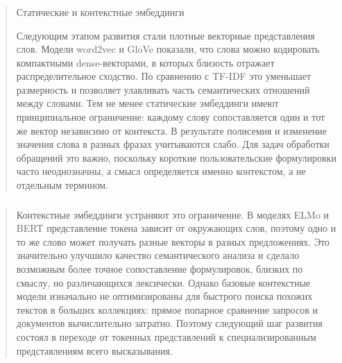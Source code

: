 \documentclass[
]{article}
\begin{document}
\hypertarget{section-2}{%
\subsubsection{}\label{section-2}}

\begin{quote}
Статические и контекстные эмбеддинги

Следующим этапом развития стали плотные векторные представления слов.
Модели word2vec и GloVe показали, что слова можно кодировать компактными
dense-векторами, в которых близость отражает распределительное сходство.
По сравнению с TF-IDF это уменьшает размерность и позволяет улавливать
часть семантических отношений между словами. Тем не менее статические
эмбеддинги имеют принципиальное ограничение: каждому слову
сопоставляется один и тот же вектор независимо от контекста. В
результате полисемия и изменение значения слова в разных фразах
учитываются слабо. Для задач обработки обращений это важно, поскольку
короткие пользовательские формулировки часто неоднозначны, а смысл
определяется именно контекстом, а не отдельным термином.
\end{quote}

\hypertarget{section-3}{%
\subsubsection{}\label{section-3}}

\begin{quote}
Контекстные эмбеддинги устраняют это ограничение. В моделях ELMo и BERT
представление токена зависит от окружающих слов, поэтому одно и то же
слово может получать разные векторы в разных предложениях. Это
значительно улучшило качество семантического анализа и сделало возможным
более точное сопоставление формулировок, близких по смыслу, но
различающихся лексически. Однако базовые контекстные модели изначально
не оптимизированы для быстрого поиска похожих текстов в больших
коллекциях: прямое попарное сравнение запросов и документов
вычислительно затратно. Поэтому следующий шаг развития состоял в
переходе от токенных представлений к специализированным представлениям
всего высказывания.
\end{quote}

\hypertarget{section-4}{%
\subsubsection{}\label{section-4}}
\end{document}
